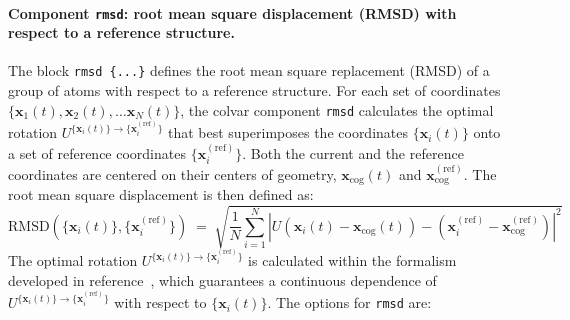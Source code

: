 \paragraph*{Component \texttt{rmsd}: root mean square displacement
  (RMSD) with respect to a reference structure.}  The block
\texttt{rmsd~\{...\}} defines the root mean square replacement
(RMSD) of a group of atoms with respect to a reference structure.  For
each set of coordinates $\{ \mathbf{x}_1(t), \mathbf{x}_2(t), \ldots
\mathbf{x}_N(t) \}$, the colvar component \texttt{rmsd} calculates the
optimal rotation
$U^{\{\mathbf{x}_{i}(t)\}\rightarrow\{\mathbf{x}_{i}^{\mathrm{(ref)}}\}}$
that best superimposes the coordinates $\{\mathbf{x}_{i}(t)\}$ onto a
set of reference coordinates $\{\mathbf{x}_{i}^{\mathrm{(ref)}}\}$.
Both the current and the reference coordinates are centered on their
centers of geometry, $\mathbf{x}_{\mathrm{cog}}(t)$ and
$\mathbf{x}_{\mathrm{cog}}^{\mathrm{(ref)}}$.  The root mean square
displacement is then defined as:
\begin{equation}
  \label{eq:cvc_rmsd}
  { \mathrm{RMSD}(\{\mathbf{x}_{i}(t)\},
    \{\mathbf{x}_{i}^{\mathrm{(ref)}}\}) } \; = \; \sqrt{
    \frac{1}{N} \sum_{i=1}^{N} \left|
      U
      \left(\mathbf{x}_{i}(t) - \mathbf{x}_{\mathrm{cog}}(t)\right) -
      \left(\mathbf{x}_{i}^{\mathrm{(ref)}} -
        \mathbf{x}_{\mathrm{cog}}^{\mathrm{(ref)}} \right) \right|^{2} }
\end{equation}
The optimal rotation
$U^{\{\mathbf{x}_{i}(t)\}\rightarrow\{\mathbf{x}_{i}^{\mathrm{(ref)}}\}}$
is calculated within the formalism developed in
reference~\cite{Coutsias2004}, which guarantees a continuous
dependence of
$U^{\{\mathbf{x}_{i}(t)\}\rightarrow\{\mathbf{x}_{i}^{\mathrm{(ref)}}\}}$
with respect to $\{\mathbf{x}_{i}(t)\}$.  The options for \texttt{rmsd}
are:
